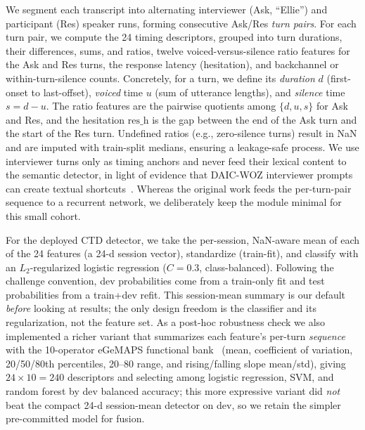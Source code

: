 \documentclass{article}
\begin{document}
We segment each transcript into alternating interviewer (Ask, ``Ellie'') and participant (Res) speaker runs, forming consecutive Ask/Res \emph{turn pairs}. 
For each turn pair, we compute the 24 timing descriptors, grouped into turn durations, their differences, sums, and ratios, twelve voiced-versus-silence ratio features for the Ask and Res turns, the response latency (hesitation), and backchannel or within-turn-silence counts. 
Concretely, for a turn, we define its \emph{duration} $d$ (first-onset to last-offset), \emph{voiced} time $u$ (sum of utterance lengths), and \emph{silence} time $s = d - u$. 
The ratio features are the pairwise quotients among $\{d, u, s\}$ for Ask and Res, and the hesitation $\text{res\_h}$ is the gap between the end of the Ask turn and the start of the Res turn. 
Undefined ratios (e.g., zero-silence turns) result in NaN and are imputed with train-split medians, ensuring a leakage-safe process. 
We use interviewer turns only as timing anchors and never feed their lexical content to the semantic detector, in light of evidence that DAIC-WOZ interviewer prompts can create textual shortcuts~\cite{burdisso2024prompts}. 
Whereas the original work feeds the per-turn-pair sequence to a recurrent network, we deliberately keep the module minimal for this small cohort.

For the deployed CTD detector, we take the per-session, NaN-aware mean of each of the 24 features (a 24-d session vector), standardize (train-fit), and classify with an $L_2$-regularized logistic regression ($C{=}0.3$, class-balanced).\label{sec:ctd-deploy} 
Following the challenge convention, dev probabilities come from a train-only fit and test probabilities from a train+dev refit. This session-mean summary is our default \emph{before} looking at results; the only design freedom is the classifier and its regularization, not the feature set. 
As a post-hoc robustness check we also implemented a richer variant that summarizes each feature's per-turn \emph{sequence} with the 10-operator eGeMAPS functional bank~\cite{eyben2016egemaps} (mean, coefficient of variation, 20/50/80th percentiles, 20--80 range, and rising/falling slope mean/std), giving $24\times10=240$ descriptors and selecting among logistic regression, SVM, and random forest by dev balanced accuracy; this more expressive variant did \emph{not} beat the compact 24-d session-mean detector on dev, so we retain the simpler pre-committed model for fusion.
\end{document}
